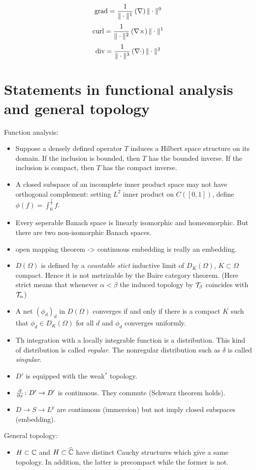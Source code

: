 \documentclass[11pt]{article}
\let\realsection\section
\renewcommand\section{\newpage\realsection}
\begin{document}
\bigskip

\[\operatorname{grad}=\frac1{\|\cdot\|^1}\,(\nabla)\,\|\cdot\|^0\]
\[\operatorname{curl}=\frac1{\|\cdot\|^2}\,(\nabla\times)\,\|\cdot\|^1\]
\[\operatorname{div}=\frac1{\|\cdot\|^3}\,(\nabla\cdot)\,\|\cdot\|^2\]







\section{Statements in functional analysis and general topology}
Function analysis:
\begin{itemize}
\item Suppose a densely defined operator $T$ induces a Hilbert space structure on its domain. If the inclusion is bounded, then $T$ has the bounded inverse. If the inclusion is compact, then $T$ has the compact inverse.
\item A closed subspace of an incomplete inner product space may not have orthogonal complement: setting $L^2$ inner product on $C([0,1])$, define $\phi(f)=\int_0^{\frac12}f$.
\item Every seperable Banach space is linearly isomorphic and homeomorphic. But there are two non-isomorphic Banach spaces.
\item open mapping theorem -> continuous embedding is really an embedding.
\item $D(\Omega)$ is defined by a \emph{countable stict} inductive limit of $D_K(\Omega)$, $K\subset\Omega$ compact. Hence it is not metrizable by the Baire category theorem. (Here strict means that whenever $\alpha<\beta$ the induced topology by $\mathcal{T}_\beta$ coincides with $\mathcal{T}_\alpha$)
\item A net $(\phi_d)_d$ in $D(\Omega)$ converges if and only if there is a compact $K$ such that $\phi_d\in D_K(\Omega)$ for all $d$ and $\phi_d$ converges uniformly.
\item Th integration with a locally integrable function is a distribution. This kind of distribution is called \emph{regular}. The nonregular distribution such as $\delta$ is called \emph{singular}.
\item $D'$ is equipped with the weak$^*$ topology.
\item $\pd{x}\colon D'\to D'$ is continuous. They commute (Schwarz theorem holds).
\item $D\to S\to L^p$ are continuous (immersion) but not imply closed subspaces (embedding).
\end{itemize}
General topology:
\begin{itemize}
\item $H\subset\mathbb{C}$ and $H\subset\widehat{\mathbb{C}}$ have distinct Cauchy structures which give a same topology. In addition, the latter is precompact while the former is not.
\end{itemize}
\end{document}

